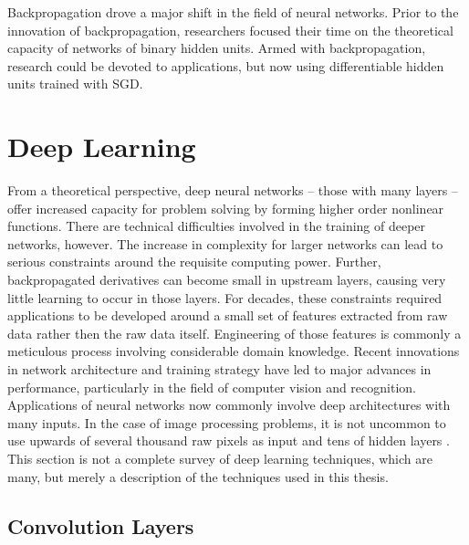 Backpropagation drove a major shift in the field of neural networks.  Prior to the innovation of backpropagation, researchers focused their time on the theoretical capacity of networks of binary hidden units.  Armed with backpropagation, research could be devoted to applications, but now using differentiable hidden units trained with SGD.


\section{Deep Learning}
\label{deeplearning}

From a theoretical perspective, deep neural networks -- those with many layers -- offer increased capacity for problem solving by forming higher order nonlinear functions.  There are technical difficulties involved in the training of deeper networks, however.  The increase in complexity for larger networks can lead to serious constraints around the requisite computing power.  Further, backpropagated derivatives can become small in upstream layers, causing very little learning to occur in those layers.  For decades, these constraints required applications to be developed around a small set of features extracted from raw data rather then the raw data itself.  Engineering of those features is commonly a meticulous process involving considerable domain knowledge.  Recent innovations in network architecture and training strategy have led to major advances in performance, particularly in the field of computer vision and recognition.
Applications of neural networks now commonly involve deep architectures with many inputs.
In the case of image processing problems, it is not uncommon to use upwards of several thousand raw pixels as input and tens of hidden layers \cite{lecun2015deep}.
This section is not a complete survey of deep learning techniques, which are many, but merely a description of the techniques used in this thesis.

\subsection{Convolution Layers}

